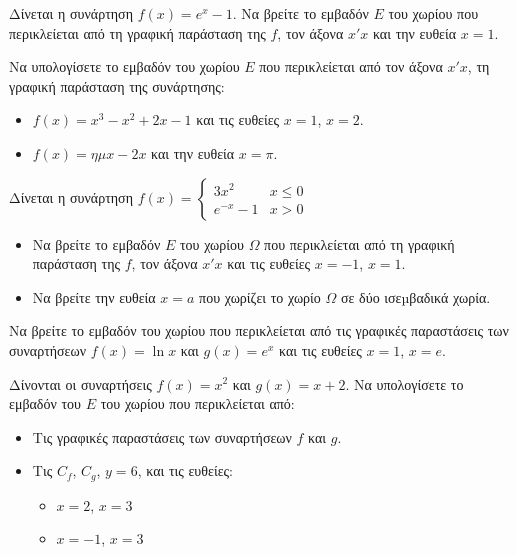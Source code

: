 \documentclass{../presentation}
\begin{document}
\begin{askisi}
  Δίνεται η συνάρτηση $f(x)=e^x-1$. Να βρείτε το εμβαδόν $E$ του χωρίου που περικλείεται από τη γραφική παράσταση της $f$, τον άξονα $x'x$ και την ευθεία $x=1$.
\end{askisi}

\begin{askisi}
  Να υπολογίσετε το εμβαδόν του χωρίου $E$ που περικλείεται από τον άξονα $x'x$, τη γραφική παράσταση της συνάρτησης:
  \begin{itemize}[<+->]
    \item $f(x)=x^3-x^2+2x-1$ και τις ευθείες $x=1$, $x=2$.
    \item $f(x)=ημx-2x$ και την ευθεία $x=π$.
  \end{itemize}
\end{askisi}


\begin{askisi}
  Δίνεται η συνάρτηση $f(x)=\begin{cases}
      3x^2     & x \leq 0 \\
      e^{-x}-1 & x>0
    \end{cases}$
  \begin{itemize}[<+->]
    \item Να βρείτε το εμβαδόν $E$ του χωρίου $Ω$ που περικλείεται από τη γραφική παράσταση της $f$, τον άξονα $x'x$ και τις ευθείες $x=-1$, $x=1$.
    \item Να βρείτε την ευθεία $x=a$ που χωρίζει το χωρίο $Ω$ σε δύο ισεµβαδικά χωρία.
  \end{itemize}
\end{askisi}

\begin{askisi}
  Να βρείτε το εμβαδόν του χωρίου που περικλείεται από τις γραφικές παραστάσεις των συναρτήσεων $f(x)=\ln x$ και $g(x)=e^x$ και τις ευθείες $x=1$, $x=e$.
\end{askisi}


\begin{askisi}
  Δίνονται οι συναρτήσεις $f(x)=x^2$ και $g(x)=x+2$. Να υπολογίσετε το εμβαδόν του $E$ του χωρίου που περικλείεται από:
  \begin{itemize}[<+->]
    \item Τις γραφικές παραστάσεις των συναρτήσεων $f$ και $g$.
    \item Τις $C_f$, $C_g$, $y=6$, και τις ευθείες:
          \begin{itemize}[<+->]
            \item $x=2$, $x=3$
            \item $x=-1$, $x=3$
          \end{itemize}
  \end{itemize}
\end{askisi}
\end{document}
